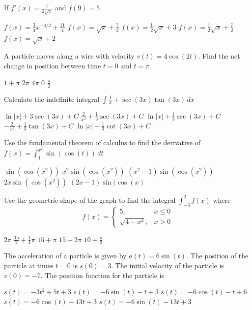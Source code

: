 \documentclass[11pt]{article}
\begin{document}
\begin{questions}
\begin{multiplechoice}{5}
\question If $f'(x) = \frac{1}{2\sqrt{x}}$ and $f(9) = 5$
\begin{answers}{2}
\ans $f(x) = \frac{3}{4}x^{-3/2} +  \frac{11}{4}$
\ans $f(x) = \sqrt{x} + \frac{7}{2}$
\ans $f(x) = \frac{1}{2}\sqrt{x} + 3$
\ans $f(x) = \frac{1}{2}\sqrt{x} + \frac{7}{2}$
\ans $f(x) = \sqrt{x} + 2$
\end{answers}


\question A particle moves along a wire with velocity $v(t) = 4\cos(2t)$.  Find the
net change in position between time $t = 0$ and $t = \pi$
\begin{answers}{2}
\ans $1  + \pi$
\ans $2\pi$
\ans $4\pi$
\ans $0$
\ans $\frac{\pi}{2}$
\end{answers}

\question Calculate the indefinite integral 
$\displaystyle \int \frac{1}{x} + \sec(3x) \tan(3x) \, dx$
\begin{answers}{2}
\ans $ \ln |x| + 3 \sec(3x) + C$
\ans $\frac{2}{x^2} + \frac{1}{3}\sec(3x) + C$
\ans $\ln|x|  + \frac{1}{3}\sec(3x) + C$
\ans $-\frac{2}{x^2}  + \frac{1}{3}\tan(3x) + C$
\ans $\ln |x| + \frac{1}{3}\cot(3x) + C$
\end{answers}


\newpage

\question Use the fundamental theorem of calculus to find the derivative of 
$\displaystyle f(x) = \int_1^{x^2} \sin(\cos(t)) \, dt$
\begin{answers}{2}
\ans $\sin(\cos(x^2))$
\ans $x^2 \sin(\cos(x^2))$
\ans $(x^2 - 1) \sin(\cos(x^2))$
\ans $2x \sin(\cos(x^2))$
\ans $(2x - 1) \sin(\cos(x)$
\end{answers}

\question Use the geometric shape of the graph to find the integral 
$\displaystyle \int_{-3}^2 f(x)$ where 
$$ f(x) = 
\begin{cases}
5, & x \le 0 \\
\sqrt{4 - x^2}, & x > 0
\end{cases}
$$
\begin{answers}{2}
\ans $2\pi$
\ans $\frac{15}{2} + \frac{1}{4}\pi$
\ans $15 + \pi$
\ans $15 + 2\pi$
\ans $10  + \frac{\pi}{2}$
\end{answers}

\question The acceleration of a particle is given by $a(t) = 6\sin(t)$.  The position
of the particle at times $t = 0$ is $s(0) = 3$.  The initial velocity of the particle is $v(0) = -7$.
The position function for the particle is
\begin{answers}{2}
\ans $s(t) = -3t^2 + 5t + 3$ 
\ans $s(t) = -6 \sin(t) -t + 3$
\ans $s(t) = -6 \cos(t) -t + 6$
\ans $s(t) = -6 \cos(t) - 13t + 3$
\ans $s(t) = -6 \sin(t) - 13t + 3$
\end{answers}


\end{multiplechoice}
\end{questions}
\end{document}
